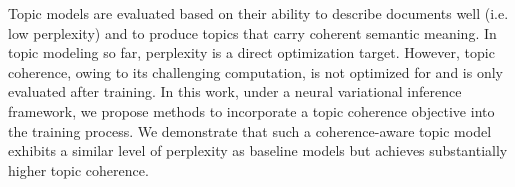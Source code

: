 Topic models are evaluated based on their ability to describe documents well (i.e. low perplexity) and to produce topics that carry coherent semantic meaning. In topic modeling so far, perplexity is a direct optimization target. However, topic coherence, owing to its challenging computation, is not optimized for and is only evaluated after training. In this work, under a neural variational inference framework, we propose methods to incorporate a topic coherence objective into the training process. We demonstrate that such a coherence-aware topic model exhibits a similar level of perplexity as baseline models but achieves substantially higher topic coherence.
